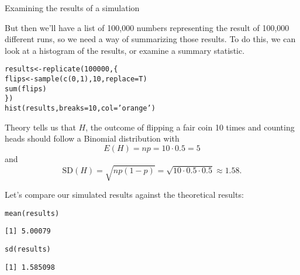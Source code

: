 \documentclass{beamer}\usepackage[]{graphicx}\usepackage[]{color}
\makeatletter
\newcommand{\hlnum}[1]{\textcolor[rgb]{0.824,0.412,0.118}{#1}}%
\newcommand{\hlstr}[1]{\textcolor[rgb]{1,0.894,0.71}{#1}}%
\newcommand{\hlstd}[1]{\textcolor[rgb]{1,0.894,0.769}{#1}}%
\newcommand{\hlkwb}[1]{\textcolor[rgb]{0.804,0.776,0.451}{#1}}%
\newcommand{\hlkwc}[1]{\textcolor[rgb]{0.78,0.941,0.545}{#1}}%
\newcommand{\hlkwd}[1]{\textcolor[rgb]{1,0.78,0.769}{#1}}%
\newenvironment{kframe}{%
 \def\at@end@of@kframe{}%
 \ifinner\ifhmode%
  \def\at@end@of@kframe{\end{minipage}}%
  \begin{minipage}{\columnwidth}%
 \fi\fi%
 \def\FrameCommand##1{\hskip\@totalleftmargin \hskip-\fboxsep
 \colorbox{shadecolor}{##1}\hskip-\fboxsep
     \hskip-\linewidth \hskip-\@totalleftmargin \hskip\columnwidth}%
 \MakeFramed {\advance\hsize-\width
   \@totalleftmargin\z@ \linewidth\hsize
   \@setminipage}}%
 {\par\unskip\endMakeFramed%
 \at@end@of@kframe}
\newenvironment{knitrout}{}{} %
\makeatother
\begin{document}
\begin{darkframes}
\begin{frame}{Examining the results of a simulation}
      \bigskip\pause

      But then we'll have a list of 100,000 numbers representing the result of 100,000 different runs, so we need a way of summarizing those results. To do this, we can look at a histogram of the results, or examine a summary statistic.
    \end{frame}

    \begin{frame}[fragile]
\begin{knitrout}
\begin{kframe}
\begin{alltt}
\hlstd{results} \hlkwb{<-} \hlkwd{replicate}\hlstd{(}\hlnum{100000}\hlstd{, \{}
  \hlstd{flips} \hlkwb{<-} \hlkwd{sample}\hlstd{(}\hlkwd{c}\hlstd{(}\hlnum{0}\hlstd{,} \hlnum{1}\hlstd{),} \hlnum{10}\hlstd{,} \hlkwc{replace}\hlstd{=T)}
  \hlkwd{sum}\hlstd{(flips)}
\hlstd{\})}
\hlkwd{hist}\hlstd{(results,} \hlkwc{breaks}\hlstd{=}\hlnum{10}\hlstd{,} \hlkwc{col}\hlstd{=}\hlstr{'orange'}\hlstd{)}
\end{alltt}
\end{kframe}


\end{knitrout}
    \end{frame}

    \begin{frame}[fragile]
      Theory tells us that $H$, the outcome of flipping a fair coin 10 times and counting heads should follow a Binomial distribution with
      \[
        E(H) = np=10\cdot 0.5=5
      \]
      and
      \[
        \text{SD}(H) = \sqrt{np(1-p)}=\sqrt{10\cdot 0.5\cdot 0.5} \approx 1.58.
      \]

      \bigskip\pause

      Let's compare our simulated results against the theoretical results:
\begin{knitrout}
\begin{kframe}
\begin{alltt}
\hlkwd{mean}\hlstd{(results)}
\end{alltt}
\begin{verbatim}
[1] 5.00079
\end{verbatim}
\begin{alltt}
\hlkwd{sd}\hlstd{(results)}
\end{alltt}
\begin{verbatim}
[1] 1.585098
\end{verbatim}
\end{kframe}
\end{knitrout}
    \end{frame}


\end{darkframes}
\end{document}
